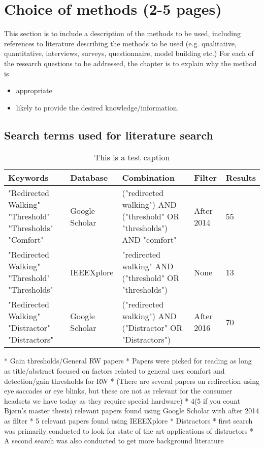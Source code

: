 \chapter{Choice of methods (2-5 pages)}
This section is to include a description of the methods to be used,
including references to literature describing the methods to be used
(e.g. qualitative, quantitative, interviews, surveys,
questionnaire,  model building etc.)
For each of the research questions to be addressed,
the chapter is to explain why the method is
\begin{itemize}
\item appropriate
\item likely to provide the desired knowledge/information.
\end{itemize}

\section{Search terms used for literature search}
\begin{table}[h!]
\centering
\begin{tabularx}{\textwidth}{|X|m{1.7cm}|X|m{1.5cm}|m{1.20cm}|} 
\hline
Keywords & Database & Combination & Filter & Results\\ 
\hline
"Redirected Walking"\newline
"Threshold"\newline
"Thresholds"\newline
"Comfort"& Google Scholar & ("redirected walking") AND ("threshold" OR "thresholds") AND "comfort" & After 2014 & 55\\ 
\hline
"Redirected Walking"\newline
"Threshold"\newline
"Thresholds" & IEEEXplore & "redirected walking" AND ("threshold" OR "thresholds") & None & 13\\ 
"Redirected Walking"\newline
"Distractor"\newline
"Distractors" & Google Scholar & ("redirected walking") AND ("Distractor" OR "Distractors") & After 2016 & 70
\hline
\end{tabularx}
\caption{This is a test caption}
\label{table:literaturekeywords}
\end{table}
    
    * Gain thresholds/General RW papers
        * Papers were picked for reading as long as title/abstract focused on factors related to general user comfort and detection/gain thresholds for RW
        * (There are several papers on redirection using eye saccades or eye blinks, but these are not as relevant for the consumer headsets we have today as they require special hardware)
        * 4(5 if you count Bjørn's master thesis) relevant papers found using Google Scholar with after 2014 as filter
        * 5 relevant papers found using IEEEXplore
    * Distractors
       * first search was primarily conducted to look for state of the art applications of distractors
       * A second search was also conducted to get more background literature
       
